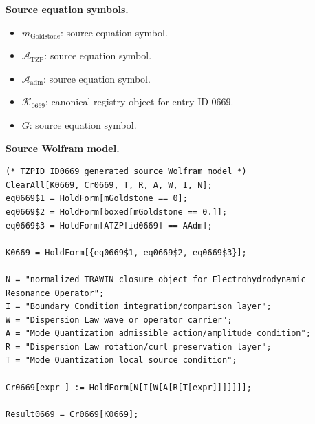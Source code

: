 \begin{minipage}[t]{0.49\linewidth}
\begingroup
\small
\raggedright
\textbf{Source equation symbols.}\par
\begin{itemize}[leftmargin=1.35em,itemsep=1pt,topsep=1pt,parsep=0pt]
    \item $m_{\mathrm{Goldstone}}$: source equation symbol.
    \item $\mathcal{A}_{\mathrm{TZP}}$: source equation symbol.
    \item $\mathcal{A}_{\mathrm{adm}}$: source equation symbol.
    \item $\mathcal{K}_{0669}$: canonical registry object for entry ID 0669.
    \item $G$: source equation symbol.
\end{itemize}
\endgroup
\end{minipage}\hfill
\begin{minipage}[t]{0.47\linewidth}
\begingroup
\scriptsize
\raggedright
\textbf{Source Wolfram model.}\par
\begin{Verbatim}[fontsize=\tiny,breaklines=true,breakanywhere=true]
(* TZPID ID0669 generated source Wolfram model *)
ClearAll[K0669, Cr0669, T, R, A, W, I, N];
eq0669$1 = HoldForm[mGoldstone == 0];
eq0669$2 = HoldForm[boxed[mGoldstone == 0.]];
eq0669$3 = HoldForm[ATZP[id0669] == AAdm];

K0669 = HoldForm[{eq0669$1, eq0669$2, eq0669$3}];

N = "normalized TRAWIN closure object for Electrohydrodynamic Resonance Operator";
I = "Boundary Condition integration/comparison layer";
W = "Dispersion Law wave or operator carrier";
A = "Mode Quantization admissible action/amplitude condition";
R = "Dispersion Law rotation/curl preservation layer";
T = "Mode Quantization local source condition";

Cr0669[expr_] := HoldForm[N[I[W[A[R[T[expr]]]]]]];

Result0669 = Cr0669[K0669];
\end{Verbatim}
\endgroup
\end{minipage}

